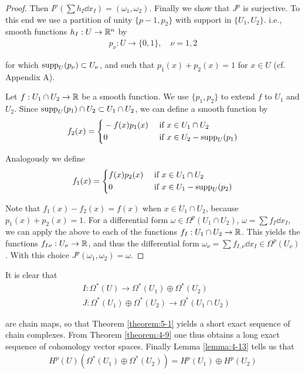 \begin{proof}
  Then  $I^p(\sum h_I\dd x_I) = (\omega_1, \omega_2)$. Finally we show that $J^p$ is surjective. To this end we use 
  a partition of unity $\{p-1, p_2\}$ with support in $\{U_1, U_2\}$. i.e., smooth functions $h_I:U\to {\ensuremath{\mathbb{R}}}^n$ by 
  \begin{align*}
    p_\nu: U\to \{0, 1\}, \quad \nu = 1, 2
  \end{align*}

  for which $\mathrm{supp}_U(p_\nu)\subset U_\nu$, and such that $p_1(x) + p_2(x) = 1$ for $x\in U$ (cf.
  Appendix A).

  Let $f:U_1\cap U_2\to{\ensuremath{\mathbb{R}}}$ be a smooth function. We use $\{p_1, p_2\}$ to extend $f$ to $U_1$ and
  $U_2$. Since $\mathrm{supp}_U(p_1)\cap U_2\subset U_1\cap U_2$, we can define a smooth function by
  \begin{align*}
    f_2(x) = \left\{\begin{aligned}
      & -f(x)p_1(x) && \text{ if } x\in U_1\cap U_2 \\
      & 0 && \text{ if } x\in U_2 - \mathrm{supp}_U(p_1) 
    \end{aligned}\right.
  \end{align*}

  Analogously we define 
  \begin{align*}
    f_1(x) = \left\{\begin{aligned}
      & f(x)p_2(x) && \text{ if } x\in U_1\cap U_2 \\
      & 0 && \text{ if } x\in U_1 - \mathrm{supp}_U(p_2) 
    \end{aligned}\right.
  \end{align*}

  Note that $f_1(x) - f_2(x) = f(x)$ when $x\in U_1\cap U_2$, because $p_1(x) + p_2(x) = 1$.
  For a differential form $\omega\in \Omega^p(U_1\cap U_2)$, $\omega = \sum f_I\dd x_I$, we can apply 
  the above to each of the functions $f_I:U_1\cap U_2\to{\ensuremath{\mathbb{R}}}$. This yields the functions $f_{I\nu}:U_\nu\to{\ensuremath{\mathbb{R}}}$,
  and thus the differential form $\omega_\nu = \sum f_{I, \nu}\dd x_I\in\Omega^p(U_\nu)$. With this choice $J^p(\omega_1, \omega_2) 
  = \omega$. 
\end{proof}

It is clear that
\begin{align*}
  & I{:}\Omega^{*}(U)\to\Omega^{*}(U_{1})\oplus\Omega^{*}(U_{2})\\
  & J{:}\Omega^{*}(U_{1})\oplus\Omega^{*}(U_{2})\to\Omega^{*}(U_{1}\cap U_{2})
\end{align*}

are chain maps, so that Theorem \ref{theorem:5-1} yields a short exact sequence of chain
complexes. From Theorem \ref{theorem:4-9} one thus obtains a long exact sequence of
cohomology vector spaces. Finally Lemma \ref{lemma:4-13} tells us that
\begin{align*}
  H^p(U)(\Omega^*(U_1)\oplus\Omega^*(U_2)) = H^p(U_1)\oplus H^p(U_2)
\end{align*}

